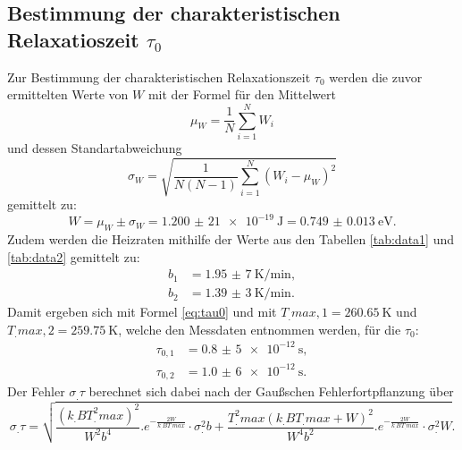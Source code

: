 \subsection{Bestimmung der charakteristischen Relaxatioszeit $\tau_0$}

Zur Bestimmung der charakteristischen Relaxationszeit $\tau_0$ werden die zuvor ermittelten Werte von $W$ mit der Formel für den Mittelwert
\[
\mu_W = \frac{1}{N}\sum_{i=1}^{N}W_i
\]
und dessen Standartabweichung
\[
\sigma_W = \sqrt{\frac{1}{N(N-1)}\sum_{i=1}^{N}(W_i-\mu_W)^2}
\]
gemittelt zu:
\[
W = \mu_W \pm \sigma_W = \SI{1,200(21)e-19}{\joule} = \SI{0.749(13)}{\electronvolt}\text{.}
\]
Zudem werden die Heizraten mithilfe der Werte aus den Tabellen \ref{tab:data1} und \ref{tab:data2} gemittelt zu:
\begin{align*}
b_1 &= \SI{1,95(7)}{\kelvin\per\minute},\\
b_2 &= \SI{1,39(3)}{\kelvin\per\minute}\text{.} 
\end{align*}
Damit ergeben sich mit Formel \eqref{eq:tau0} und mit $T_.{max,1}=\SI{260,65}{\kelvin}$ und $T_.{max,2}=\SI{259,75}{\kelvin}$, welche den Messdaten entnommen werden, für die $\tau_0$:
\begin{align*}
\tau_{0,1} &= \SI{0,8(5)e-12}{\second},\\
\tau_{0,2} &= \SI{1,0(6)e-12}{\second}\text{.}
\end{align*}
Der Fehler $\sigma_.{\tau}$ berechnet sich dabei nach der Gaußschen Fehlerfortpflanzung über
\[
\sigma_.{\tau}=\sqrt{\frac{(k_.BT^2_.{max})^2}{W^2b^4}.e^{-\frac{2 W}{k_.BT_.{max}}}\cdot\sigma^2_.b+\frac{T^2_.{max}(k_.BT_.{max}+W)^2}{W^4b^2}.e^{-\frac{2 W}{k_.BT_.{max}}}\cdot\sigma^2_.W}\text{.}
\]

